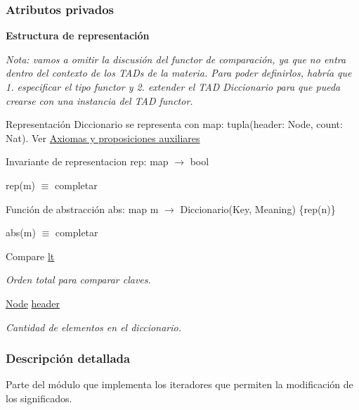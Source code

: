 \subsubsection*{\-Atributos privados}
\begin{Indent}{\bf \-Estructura de representación}\par
{\em \-Nota\-: vamos a omitir la discusión del functor de comparación, ya que no entra dentro del contexto de los \-T\-A\-Ds de la materia. \-Para poder definirlos, habría que 1. especificar el tipo functor y 2. extender el \-T\-A\-D \-Diccionario para que pueda crearse con una instancia del \-T\-A\-D functor.

\begin{DoxyParagraph}{\-Representación}
\-Diccionario se representa con map\-: tupla(header\-: Node, count\-: Nat). \-Ver \hyperlink{axiomas}{\-Axiomas y proposiciones auxiliares}
\end{DoxyParagraph}
\begin{DoxyParagraph}{\-Invariante de representacion}
rep\-: map $\to$ bool\par
 rep(m) $\equiv$ completar 
\end{DoxyParagraph}
\begin{DoxyParagraph}{\-Función de abstracción}
abs\-: map m $\to$ \-Diccionario(\-Key, \-Meaning) \{rep(n)\}\par
 abs(m) $\equiv$ completar  
\end{DoxyParagraph}
}\begin{DoxyCompactItemize}
\item 
\-Compare \hyperlink{classaed2_1_1iterator_a3f219bfe5e047bbec03e3339770ae414_a3f219bfe5e047bbec03e3339770ae414}{lt}
\begin{DoxyCompactList}\small\item\em \-Orden total para comparar claves. \end{DoxyCompactList}\item 
\hyperlink{structaed2_1_1iterator_1_1Node}{\-Node} \hyperlink{classaed2_1_1iterator_a19db18e2e77583eb1fa819e854ff9c71_a19db18e2e77583eb1fa819e854ff9c71}{header}
\begin{DoxyCompactList}\small\item\em \-Cantidad de elementos en el diccionario. \end{DoxyCompactList}\end{DoxyCompactItemize}
\end{Indent}


\subsubsection{\-Descripción detallada}
\-Parte del módulo que implementa los iteradores que permiten la modificación de los significados. 

